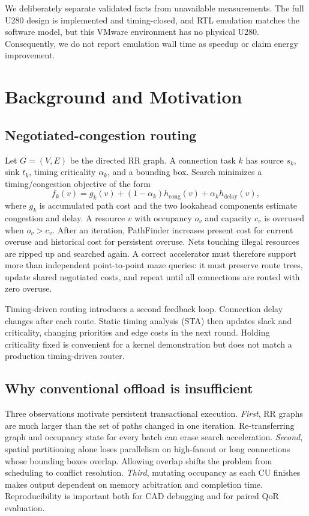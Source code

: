 \documentclass[sigconf,anonymous,review]{acmart}
\begin{document}
We deliberately separate validated facts from unavailable measurements. The
full U280 design is implemented and timing-closed, and RTL emulation matches the
software model, but this VMware environment has no physical U280. Consequently,
we do not report emulation wall time as speedup or claim energy improvement.

\section{Background and Motivation}

\subsection{Negotiated-congestion routing}

Let $G=(V,E)$ be the directed RR graph. A connection task $k$ has source
$s_k$, sink $t_k$, timing criticality $\alpha_k$, and a bounding box. Search
minimizes a timing/congestion objective of the form
\begin{equation}
 f_k(v)=g_k(v)+(1-\alpha_k)h_{\mathrm{cong}}(v)+
             \alpha_k h_{\mathrm{delay}}(v),
\end{equation}
where $g_k$ is accumulated path cost and the two lookahead components estimate
congestion and delay. A resource $v$ with occupancy $o_v$ and capacity $c_v$
is overused when $o_v>c_v$. After an iteration, PathFinder increases present
cost for current overuse and historical cost for persistent overuse. Nets
touching illegal resources are ripped up and searched again. A correct
accelerator must therefore support more than independent point-to-point maze
queries: it must preserve route trees, update shared negotiated costs, and
repeat until all connections are routed with zero overuse.

Timing-driven routing introduces a second feedback loop. Connection delay
changes after each route. Static timing analysis (STA) then updates slack and
criticality, changing priorities and edge costs in the next round. Holding
criticality fixed is convenient for a kernel demonstration but does not match
a production timing-driven router.

\subsection{Why conventional offload is insufficient}

Three observations motivate persistent transactional execution.
\textit{First}, RR graphs are much larger than the set of paths changed in one
iteration. Re-transferring graph and occupancy state for every batch can erase
search acceleration. \textit{Second}, spatial partitioning alone loses
parallelism on high-fanout or long connections whose bounding boxes overlap.
Allowing overlap shifts the problem from scheduling to conflict resolution.
\textit{Third}, mutating occupancy as each CU finishes makes output dependent on
memory arbitration and completion time. Reproducibility is important both for
CAD debugging and for paired QoR evaluation.
\end{document}
